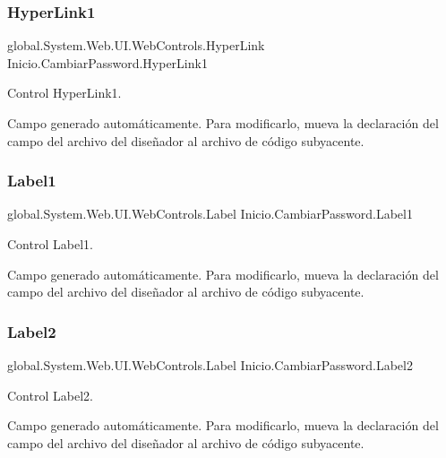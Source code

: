 \subsubsection{\texorpdfstring{HyperLink1}{HyperLink1}}
{\footnotesize\ttfamily global.\+System.\+Web.\+U\+I.\+Web\+Controls.\+Hyper\+Link Inicio.\+Cambiar\+Password.\+Hyper\+Link1\hspace{0.3cm}{\ttfamily [protected]}}



Control Hyper\+Link1. 

Campo generado automáticamente. Para modificarlo, mueva la declaración del campo del archivo del diseñador al archivo de código subyacente. \mbox{\label{class_inicio_1_1_cambiar_password_ac4c5034d33d8290117987f9fc981e247}} 
\subsubsection{\texorpdfstring{Label1}{Label1}}
{\footnotesize\ttfamily global.\+System.\+Web.\+U\+I.\+Web\+Controls.\+Label Inicio.\+Cambiar\+Password.\+Label1\hspace{0.3cm}{\ttfamily [protected]}}



Control Label1. 

Campo generado automáticamente. Para modificarlo, mueva la declaración del campo del archivo del diseñador al archivo de código subyacente. \mbox{\label{class_inicio_1_1_cambiar_password_ab4a6fd8e13543ff98bc786be8a2b3a1c}} 
\subsubsection{\texorpdfstring{Label2}{Label2}}
{\footnotesize\ttfamily global.\+System.\+Web.\+U\+I.\+Web\+Controls.\+Label Inicio.\+Cambiar\+Password.\+Label2\hspace{0.3cm}{\ttfamily [protected]}}



Control Label2. 

Campo generado automáticamente. Para modificarlo, mueva la declaración del campo del archivo del diseñador al archivo de código subyacente. \mbox{\label{class_inicio_1_1_cambiar_password_a4aa07cf906d98059cf6158cf3e31800a}} 
